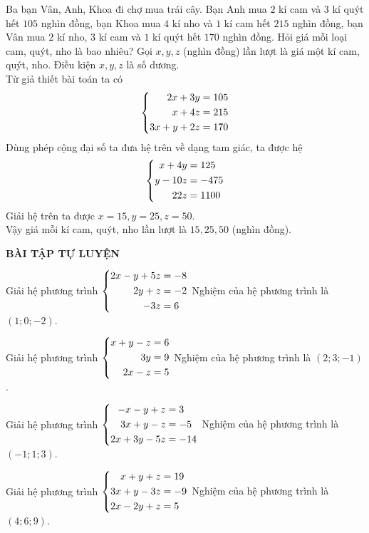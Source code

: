 \begin{vd}%
Ba bạn Vân, Anh, Khoa đi chợ mua trái cây. Bạn Anh mua $2$ kí cam và $3$ kí quýt hết $105$ nghìn đồng, bạn Khoa mua $4$ kí nho và $1$ kí cam hết $215$ nghìn đồng, bạn Vân mua $2$ kí nho, $3$ kí cam và $1$ kí quýt hết $170$ nghìn đồng. Hỏi giá mỗi loại cam, quýt, nho là bao nhiêu?
\loigiai
{Gọi $x, y, z$ (nghìn đồng) lần lượt là giá một kí cam, quýt, nho. Điều kiện $x, y, z$ là số dương.\\
Từ giả thiết bài toán ta có
\[ \left\{\begin{aligned}2x+3y&=105\\x+4z&=215\\3x+y+2z&=170\end{aligned}\right. \]
Dùng phép cộng đại số ta đưa hệ trên về dạng tam giác, ta được hệ
\[ \left\{\begin{aligned}x+4y&=125\\y-10z&=-475\\22z&=1100 \end{aligned}\right.\]
Giải hệ trên ta được $x=15, y=25, z=50$.\\
Vậy giá mỗi kí cam, quýt, nho lần lượt là $15, 25, 50$ (nghìn đồng).
}
\end{vd}

\begin{center}
\textbf{BÀI TẬP TỰ LUYỆN}
\end{center}
\begin{bt}%
Giải hệ phương trình $\left\{\begin{aligned}2x-y+5z&=-8\\2y+z&=-2\\-3z&=6\end{aligned}\right.$
\loigiai
{Nghiệm của hệ phương trình là $(1;0;-2)$.}
\end{bt}

\begin{bt}%
Giải hệ phương trình $\left\{\begin{aligned}x+y-z&=6\\3y&=9\\2x-z&=5\end{aligned}\right.$
\loigiai
{Nghiệm của hệ phương trình là $(2;3;-1)$.}
\end{bt}

\begin{bt}%
Giải hệ phương trình $\left\{\begin{aligned}-x-y+z&=3\\3x+y-z&=-5\\2x+3y-5z&=-14\end{aligned}\right.$
\loigiai
{Nghiệm của hệ phương trình là $(-1;1;3)$.}
\end{bt}

\begin{bt}%
Giải hệ phương trình $\left\{\begin{aligned}x+y+z&=19\\3x+y-3z&=-9\\2x-2y+z&=5\end{aligned}\right.$
\loigiai
{Nghiệm của hệ phương trình là $(4;6;9)$.}
\end{bt}

